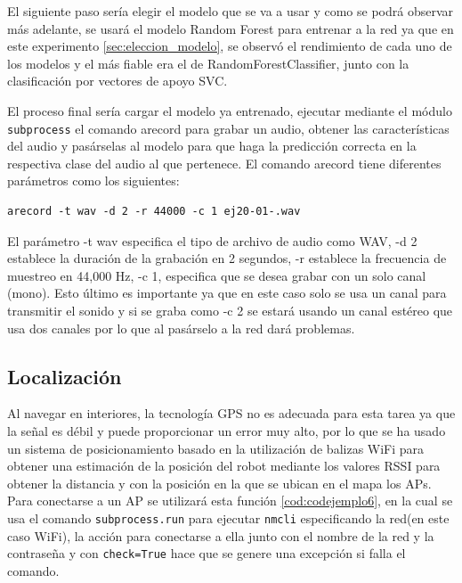 El siguiente paso sería elegir el modelo que se va a usar y como se podrá observar más adelante, se usará el modelo Random Forest para entrenar a la red ya que en este experimento \ref{sec:eleccion_modelo}, se observó el rendimiento de cada uno de los modelos y el más fiable era el de RandomForestClassifier, junto con la clasificación por vectores de apoyo SVC.

El proceso final sería cargar el modelo ya entrenado, ejecutar mediante el módulo \texttt{subprocess} el comando arecord para grabar un audio, obtener las características del audio y pasárselas al modelo para que haga la predicción correcta en la respectiva clase del audio al que pertenece. El comando arecord tiene diferentes parámetros como los siguientes: 

\begin{verbatim}
arecord -t wav -d 2 -r 44000 -c 1 ej20-01-.wav 
\end{verbatim}

El parámetro -t wav especifica el tipo de archivo de audio como WAV, -d 2 establece la duración de la grabación en 2 segundos, -r establece la frecuencia de muestreo en 44,000 Hz, -c 1, especifica que se desea grabar con un solo canal (mono). Esto último es importante ya que en este caso solo se usa un canal para transmitir el sonido y si se graba como -c 2 se estará usando un canal estéreo que usa dos canales por lo que al pasárselo a la red dará problemas.


\subsection{Localización}
\label{subsec:localización}

Al navegar en interiores, la tecnología GPS no es adecuada para esta tarea ya que la señal es débil y puede proporcionar un error muy alto, por lo que se ha usado un sistema de posicionamiento basado en la utilización de balizas WiFi para obtener una estimación de la posición del robot mediante los valores RSSI para obtener la distancia y con la posición en la que se ubican en el mapa los APs. Para conectarse a un AP se utilizará esta función \ref{cod:codejemplo6}, en la cual se usa el comando \texttt{subprocess.run} para ejecutar \texttt{nmcli} especificando la red(en este caso WiFi), la acción para conectarse a ella junto con el nombre de la red y la contraseña y con \texttt{check=True} hace que se genere una excepción si falla el comando.\\

